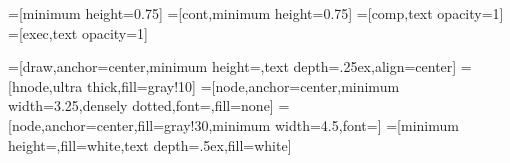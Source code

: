 =[minimum height=0.75\block]
=[cont,minimum height=0.75\block]
=[comp,text opacity=1]
=[exec,text opacity=1]

=[draw,anchor=center,minimum height=\block,text depth=.25ex,align=center]
=[hnode,ultra thick,fill=gray!10]
=[node,anchor=center,minimum width=3.25\block,densely dotted,font=\footnotesize,fill=none]
=[node,anchor=center,fill=gray!30,minimum width=4.5\block,font=\footnotesize]
=[minimum height=\block,fill=white,text depth=.5ex,fill=white]

